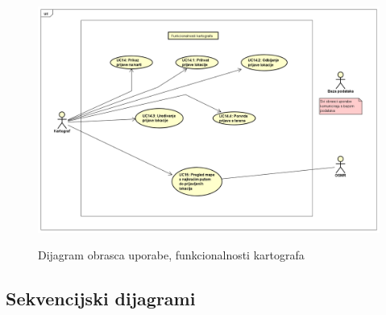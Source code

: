 		\begin{figure}[H]
			\centering
			\includegraphics[scale=0.42]{dijagrami/funkcionalnosti_kartografa} \\
			\caption{Dijagram obrasca uporabe, funkcionalnosti kartografa}
			\label{fig:funkcionalnosti_kartografa} 
		\end{figure}
			\subsection{Sekvencijski dijagrami}
				
